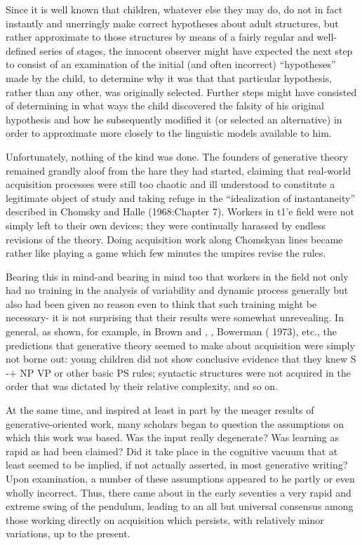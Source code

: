 Since it is well known that children, whatever else they may do, do not in fact instantly and unerringly make correct hypotheses about adult structures, but rather approximate to those structures by means of a fairly regular and well-defined series of stages, the innocent ob\-server might have expected the next step to consist of an examination of the initial (and often incorrect) ``hypotheses'' made by the child, to determine why it was that that particular hypothesis, rather than any other, was originally selected. Further steps might have con\-sisted of determining in what ways the child discovered the falsity of his original hypothesis and how he subsequently modified it (or selected an alternative) in order to approximate more closely to the linguistic models available to him.

Unfortunately, nothing of the kind was done. The founders of generative theory remained grandly aloof from the hare they had started, claiming that real-world acquisition processes were still too chaotic and ill understood to constitute a legitimate object of study and taking refuge in the ``idealization of instantaneity'' described in Chomsky and Halle (1968:Chapter 7). Workers in t1'e field were not simply left to their own devices; they were continually harassed by endless revisions of the theory. Doing acquisition work along Chom\-skyan lines became rather like playing a game which few minutes the umpires revise the rules.

Bearing this in mind-and bearing in mind too that workers in the field not only had no training in the analysis of variability and dynamic process generally but also had been given no reason even to think that such training might be necessary- it is not surprising that their results were somewhat unrevealing. In general, as shown, for example, in Brown and \citet{Hanlon1970}, \citet{Brown1973}, Bowerman ( 1973), etc., the predictions that generative theory seemed to make about acquisition were simply not borne out: young children did not
show conclusive evidence that they knew S {}-+ NP VP or other basic PS
rules; syntactic structures were not acquired in the order that was dictated by their relative complexity, and so on.

At the same time, and inspired at least in part by the meager results of generative-oriented work, many scholars began to question the assumptions on which this work was based. Was the input really degenerate? Was learning as rapid as had been claimed? Did it take place in the cognitive vacuum that at least seemed to be implied, if not actually asserted, in most generative writing? Upon examination, a number of these assumptions appeared to he partly or even wholly incorrect. Thus, there came about in the early seventies a very rapid and extreme swing of the pendulum, leading to an all but universal consensus among those working directly on acquisition which persists, with relatively minor variations, up to the present.

